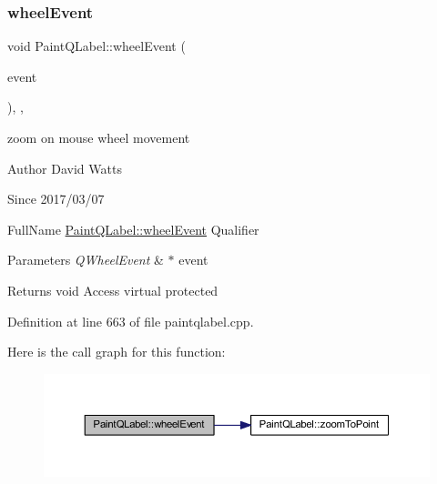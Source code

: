 \subsubsection{\texorpdfstring{wheel\+Event}{wheelEvent}}
{\footnotesize\ttfamily void Paint\+Q\+Label\+::wheel\+Event (\begin{DoxyParamCaption}\item[{Q\+Wheel\+Event $\ast$}]{event }\end{DoxyParamCaption})\hspace{0.3cm}{\ttfamily [protected]}, {\ttfamily [virtual]}, {\ttfamily [slot]}}

zoom on mouse wheel movement

\begin{DoxyAuthor}{Author}
David Watts 
\end{DoxyAuthor}
\begin{DoxySince}{Since}
2017/03/07
\end{DoxySince}
Full\+Name \hyperlink{class_paint_q_label_adcf7154233dfb4462c1cdd4531ab74ba}{Paint\+Q\+Label\+::wheel\+Event} Qualifier 
\begin{DoxyParams}{Parameters}
{\em Q\+Wheel\+Event} & $\ast$ event \\
\hline
\end{DoxyParams}
\begin{DoxyReturn}{Returns}
void Access virtual protected 
\end{DoxyReturn}


Definition at line 663 of file paintqlabel.\+cpp.

Here is the call graph for this function\+:
\nopagebreak
\begin{figure}[H]
\begin{center}
\leavevmode
\includegraphics[width=350pt]{class_paint_q_label_adcf7154233dfb4462c1cdd4531ab74ba_cgraph}
\end{center}
\end{figure}
\mbox{\label{class_paint_q_label_a30afcb97e84548909b882e0514111e03}} 
